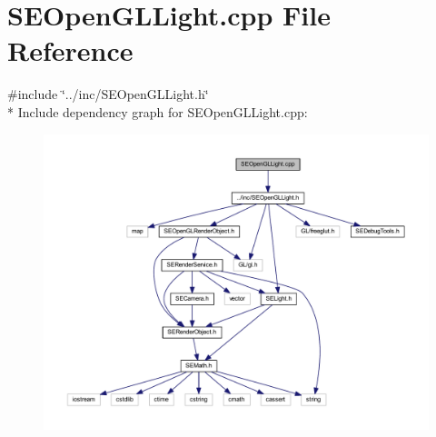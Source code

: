 \section{S\+E\+Open\+G\+L\+Light.\+cpp File Reference}
\label{_s_e_open_g_l_light_8cpp}
{\ttfamily \#include \char`\"{}../inc/\+S\+E\+Open\+G\+L\+Light.\+h\char`\"{}}\\*
Include dependency graph for S\+E\+Open\+G\+L\+Light.\+cpp\+:
\nopagebreak
\begin{figure}[H]
\begin{center}
\leavevmode
\includegraphics[width=350pt]{_s_e_open_g_l_light_8cpp__incl}
\end{center}
\end{figure}
